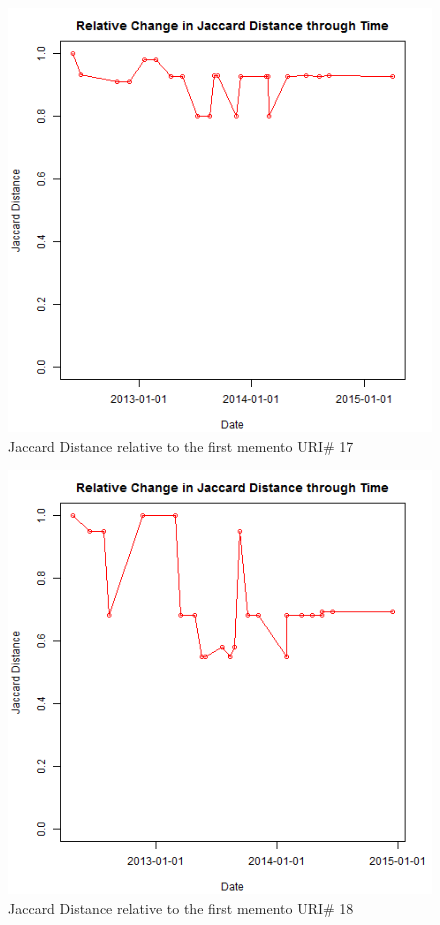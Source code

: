 \clearpage
\begin{figure}[ht]
	\begin{center}
		 \includegraphics[scale=0.60]{url17}
		  \caption{Jaccard Distance relative to the first memento URI\# 17}
	 \end{center}
\end{figure}
\begin{figure}[ht]
	\begin{center}
		 \includegraphics[scale=0.60]{url18}
		  \caption{Jaccard Distance relative to the first memento URI\# 18}
	 \end{center}
\end{figure}
